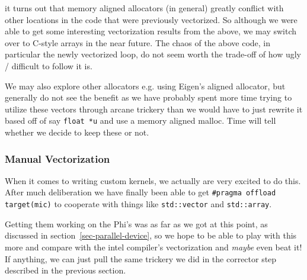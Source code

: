 \noindent it turns out that memory aligned allocators (in general) greatly conflict with other locations in the code that were previously vectorized.  So although we were able to get some interesting vectorization results from the above, we may switch over to C-style arrays in the near future.  The chaos of the above code, in particular the newly vectorized loop, do not seem worth the trade-off of how ugly / difficult to follow it is.

We may also explore other allocators e.g. using Eigen's aligned allocator, but generally do not see the benefit as we have probably spent more time trying to utilize these vectors through arcane trickery than we would have to just rewrite it based off of say \texttt{float *u} and use a memory aligned malloc.  Time will tell whether we decide to keep these or not.

\subsubsection{Manual Vectorization}
\label{sec-tune-vectorizing-manual-vectorization}

When it comes to writing custom kernels, we actually are very excited to do this.  After much deliberation we have finally been able to get \texttt{\#pragma offload target(mic)} to cooperate with things like \texttt{std::vector} and \texttt{std::array}.

Getting them working on the Phi's was as far as we got at this point, as discussed in section~\ref{sec-parallel-device}, so we hope to be able to play with this more and compare with the intel compiler's vectorization and \emph{maybe} even beat it!  If anything, we can just pull the same trickery we did in the corrector step described in the previous section.




